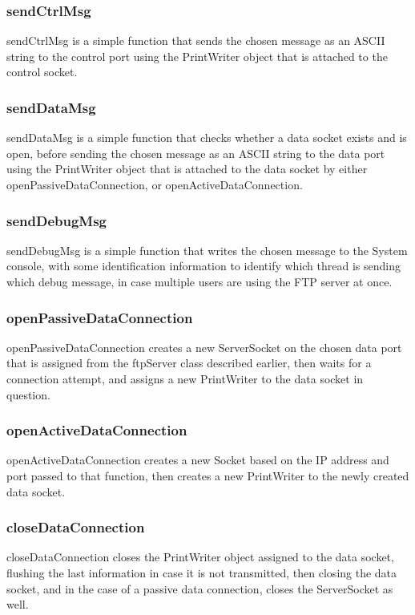 \documentclass[11pt,a4paper,titlepage]{article}
\begin{document}
\subsubsection{sendCtrlMsg}
sendCtrlMsg is a simple function that sends the chosen message as an ASCII string to the control port using the PrintWriter object that is attached to the control socket.

\subsubsection{sendDataMsg}
sendDataMsg is a simple function that checks whether a data socket exists and is open, before sending the chosen message as an ASCII string to the data port using the PrintWriter object that is attached to the data socket by either openPassiveDataConnection, or openActiveDataConnection.

\subsubsection{sendDebugMsg}
sendDebugMsg is a simple function that writes the chosen message to the System console, with some identification information to identify which thread is sending which debug message, in case multiple users are using the FTP server at once.

\subsubsection{openPassiveDataConnection}
openPassiveDataConnection creates a new ServerSocket on the chosen data port that is assigned from the ftpServer class described earlier, then waits for a connection attempt, and assigns a new PrintWriter to the data socket in question.

\subsubsection{openActiveDataConnection}
openActiveDataConnection creates a new Socket based on the IP address and port passed to that function, then creates a new PrintWriter to the newly created data socket.

\subsubsection{closeDataConnection}
closeDataConnection closes the PrintWriter object assigned to the data socket, flushing the last information in case it is not transmitted, then closing the data socket, and in the case of a passive data connection, closes the ServerSocket as well.
\end{document}
